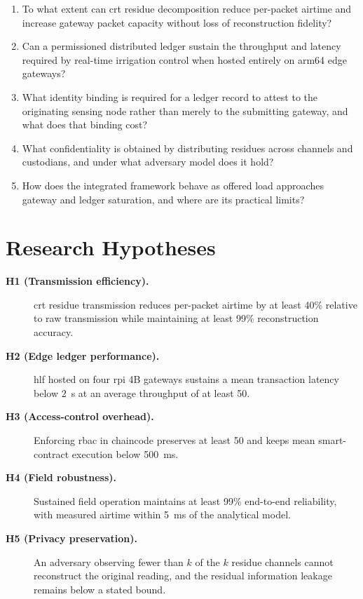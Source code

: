 \documentclass[12pt,a4paper,oneside]{book}
\begin{document}
\begin{enumerate}[label=\textbf{RQ\arabic*.}]
  \item To what extent can \gls{crt} residue decomposition reduce per-packet
        airtime and increase gateway packet capacity without loss of
        reconstruction fidelity?
  \item Can a permissioned distributed ledger sustain the throughput and latency
        required by real-time irrigation control when hosted entirely on
        \gls{arm64} edge gateways?
  \item What identity binding is required for a ledger record to attest to the
        originating sensing node rather than merely to the submitting gateway,
        and what does that binding cost?
  \item What confidentiality is obtained by distributing residues across
        channels and custodians, and under what adversary model does it hold?
  \item How does the integrated framework behave as offered load approaches
        gateway and ledger saturation, and where are its practical limits?
\end{enumerate}

\section{Research Hypotheses}
\label{sec:hypotheses}

\begin{description}
  \item[\textnormal{\textbf{H1 (Transmission efficiency).}}] \gls{crt} residue
        transmission reduces per-packet airtime by at least 40\% relative to raw
        transmission while maintaining at least 99\% reconstruction accuracy.

  \item[\textnormal{\textbf{H2 (Edge ledger performance).}}] \gls{hlf} hosted on
        four \gls{rpi} 4B gateways sustains a mean transaction latency below
        \SI{2}{\second} at an average throughput of at least \SI{50}{\tps}.

  \item[\textnormal{\textbf{H3 (Access-control overhead).}}] Enforcing
        \gls{rbac} in chaincode preserves at least \SI{50}{\tps} and keeps mean
        smart-contract execution below \SI{500}{\milli\second}.

  \item[\textnormal{\textbf{H4 (Field robustness).}}] Sustained field operation
        maintains at least 99\% end-to-end reliability, with measured airtime
        within \SI{5}{\milli\second} of the analytical model.

  \item[\textnormal{\textbf{H5 (Privacy preservation).}}] An adversary observing
        fewer than $k$ of the $k$ residue channels cannot reconstruct the
        original reading, and the residual information leakage remains below a
        stated bound.
\end{description}
\end{document}
